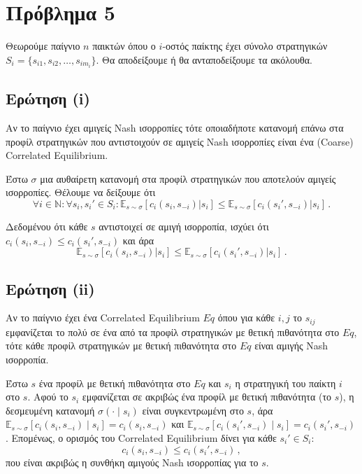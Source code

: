 \section{Πρόβλημα 5}

Θεωρούμε παίγνιο $n$ παικτών όπου ο $i$-οστός παίκτης έχει σύνολο στρατηγικών
$S_i = \{s_{i1}, s_{i2}, \ldots, s_{im_i}\}$. Θα αποδείξουμε ή θα ανταποδείξουμε
τα ακόλουθα.

\subsection{Ερώτηση (i)}

Αν το παίγνιο έχει αμιγείς Nash ισορροπίες τότε οποιαδήποτε κατανομή επάνω στα
προφίλ στρατηγικών που αντιστοιχούν σε αμιγείς Nash ισορροπίες είναι ένα
(Coarse) Correlated Equilibrium.

Έστω $\sigma$ μια αυθαίρετη κατανομή στα προφίλ στρατηγικών που αποτελούν
αμιγείς ισορροπίες. Θέλουμε να δείξουμε ότι
$$
    \forall i \in \mathbb{N} \colon \forall s_i, s_i' \in S_i \colon
        \mathbb{E}_{s \sim \sigma} [c_i(s_i, s_{-i}) | s_i] \leq
        \mathbb{E}_{s \sim \sigma} [c_i(s_i', s_{-i}) | s_i] \,.
$$

Δεδομένου ότι κάθε $s$ αντιστοιχεί σε αμιγή ισορροπία, ισχύει ότι
$c_i(s_i, s_{-i}) \leq c_i(s_i', s_{-i})$ και άρα
$$
    \mathbb{E}_{s \sim \sigma} [c_i(s_i, s_{-i}) | s_i] \leq
    \mathbb{E}_{s \sim \sigma} [c_i(s_i', s_{-i}) | s_i] \,.
$$

\subsection{Ερώτηση (ii)}

Αν το παίγνιο έχει ένα Correlated Equilibrium $Eq$ όπου για κάθε $i, j$ το $s_{ij}$
εμφανίζεται το πολύ σε ένα από τα προφίλ στρατηγικών με θετική πιθανότητα στο $Eq$,
τότε κάθε προφίλ στρατηγικών με θετική πιθανότητα στο $Eq$ είναι αμιγής Nash
ισορροπία.

Έστω $s$ ένα προφίλ με θετική πιθανότητα στο $Eq$ και $s_i$ η στρατηγική του
παίκτη $i$ στο $s$. Αφού το $s_i$ εμφανίζεται σε ακριβώς ένα προφίλ με θετική
πιθανότητα (το $s$), η δεσμευμένη κατανομή $\sigma(\cdot \mid s_i)$ είναι
συγκεντρωμένη στο $s$, άρα
$\mathbb{E}_{s \sim \sigma}[c_i(s_i, s_{-i}) \mid s_i] = c_i(s_i, s_{-i})$
και
$\mathbb{E}_{s \sim \sigma}[c_i(s_i', s_{-i}) \mid s_i] = c_i(s_i', s_{-i})$.
Επομένως, ο ορισμός του Correlated Equilibrium δίνει για κάθε $s_i' \in S_i$:
$$
    c_i(s_i, s_{-i}) \leq c_i(s_i', s_{-i}) \,,
$$
που είναι ακριβώς η συνθήκη αμιγούς Nash ισορροπίας για το $s$.

